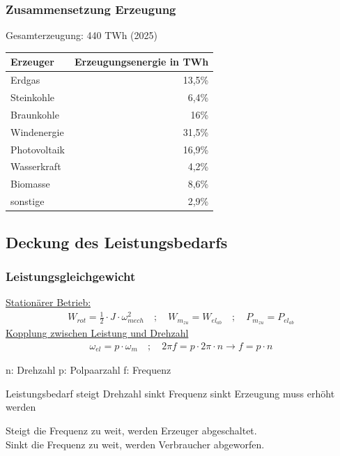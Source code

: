 \subsubsection{Zusammensetzung Erzeugung}
    Gesamterzeugung: 440 TWh (2025) 
    \begin{table}[H]
        \begin{tabular}{l r}
            \toprule
            \textbf{Erzeuger} & \textbf{Erzeugungsenergie in TWh} \\
            \midrule
            Erdgas & 13,5\% \\
            Steinkohle & 6,4\% \\
            Braunkohle & 16\% \\
            Windenergie & 31,5\% \\
            Photovoltaik & 16,9\% \\
            Wasserkraft & 4,2\% \\
            Biomasse & 8,6\% \\
            sonstige & 2,9\% \\
            \bottomrule
        \end{tabular}
    \end{table}

\subsection{Deckung des Leistungsbedarfs}
\subsubsection{Leistungsgleichgewicht}
    {\small
        \underline{Stationärer Betrieb: }
        \begin{align*}
            W_{rot} = \frac{1}{2} \cdot J \cdot \omega_{mech}^2 \quad ; \quad
            W_{m_{zu}} = W_{el_{ab}} \quad ; \quad 
            P_{m_{zu}} = P_{el_{ab}}
        \end{align*}
        \underline{Kopplung zwischen Leistung und Drehzahl}
        \begin{gather*}
            \omega_{el} = p \cdot \omega_{m} \quad ; \quad
            2 \pi f = p \cdot 2 \pi \cdot n \rightarrow f = p \cdot n 
        \end{gather*}

        n: Drehzahl \quad p: Polpaarzahl \quad f: Frequenz 

        Leistungsbedarf steigt \textrightarrow Drehzahl sinkt \textrightarrow Frequenz sinkt \textrightarrow Erzeugung muss erhöht werden

        Steigt die Frequenz zu weit, werden Erzeuger abgeschaltet. \\
        Sinkt die Frequenz zu weit, werden Verbraucher abgeworfen.
    }

